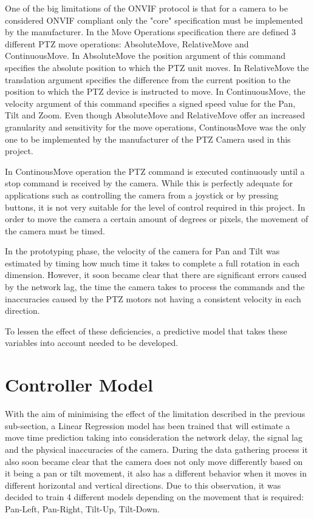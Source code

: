 \documentclass{l4proj}
\begin{document}
One of the big limitations of the ONVIF protocol is that for a camera to be considered ONVIF compliant only the "core" specification must be implemented by the manufacturer. In the Move Operations specification there are defined 3 different PTZ move operations: AbsoluteMove, RelativeMove and ContinuousMove. In AbsoluteMove the position argument of this command specifies the absolute position to which the PTZ unit moves. In RelativeMove the translation argument specifies the difference from the current position to the position to which the PTZ device is instructed to move. In ContinuousMove, the velocity argument of this command specifies a signed speed value for the Pan, Tilt and Zoom.  Even though AbsoluteMove and RelativeMove offer an increased granularity and sensitivity for the move operations,  ContinousMove was the only one to be implemented by the manufacturer of the PTZ Camera used in this project. 

In ContinousMove operation the PTZ command is executed continuously until a stop command is received by the camera. While this is perfectly adequate for applications such as controlling the camera from a joystick or by pressing buttons, it is not very suitable for the level of control required in this project. In order to move the camera a certain amount of degrees or pixels, the movement of the camera must be timed. 

In the prototyping phase, the velocity of the camera for Pan and Tilt was estimated by timing how much time it takes to complete a full rotation in each dimension. However, it soon became clear that there are significant errors caused by the network lag, the time the camera takes to process the commands and the inaccuracies caused by the PTZ motors not having a consistent velocity in each direction. 

To lessen the effect of these deficiencies, a predictive model that takes these variables into account needed to be developed.

\section{Controller Model}

With the aim of minimising the effect of the limitation described in the previous sub-section, a Linear Regression model has been trained that will estimate a move time prediction taking into consideration the network delay, the signal lag and the physical inaccuracies of the camera. During the data gathering process it also soon became clear that the camera does not only move differently based on it being a pan or tilt movement, it also has a different behavior when it moves in different horizontal and vertical directions. Due to this observation, it was decided to train 4 different models depending on the movement that is required: Pan-Left, Pan-Right, Tilt-Up, Tilt-Down.  
\end{document}
